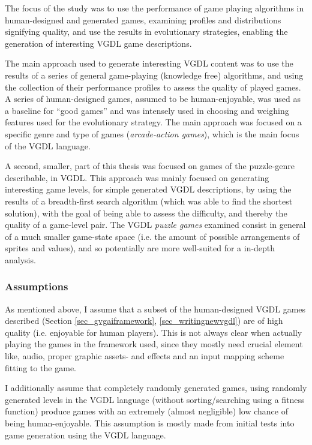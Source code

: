 \documentclass[a4paper,titlepage,final]{report}
\begin{document}
The focus of the study was to use the performance of game playing algorithms in human-designed and generated games, examining profiles and distributions signifying quality, and use the results in evolutionary strategies, enabling the generation of interesting VGDL game descriptions.

The main approach used to generate interesting VGDL content was to use the results of a series of general game-playing (knowledge free) algorithms, and using the collection of their performance profiles to assess the quality of played games.
A series of human-designed games, assumed to be human-enjoyable, was used as a baseline for ``good games'' and was intensely used in choosing and weighing features used for the evolutionary strategy.
The main approach was focused on a specific genre and type of games (\textit{arcade-action games}), which is the main focus of the VGDL language. 

A second, smaller, part of this thesis was focused on games of the puzzle-genre describable, in VGDL.
This approach was mainly focused on generating interesting game levels, for simple generated VGDL descriptions, by using the results of a breadth-first search algorithm (which was able to find the shortest solution), with the goal of being able to assess the difficulty, and thereby the quality of a game-level pair.
The VGDL \textit{puzzle games} examined consist in general of a much smaller game-state space (i.e. the amount of possible arrangements of sprites and values), and so potentially are more well-suited for a in-depth analysis.


\subsubsection*{Assumptions}
As mentioned above, I assume that a subset of the human-designed VGDL games described (Section \ref{sec_gvgaiframework}, \ref{sec_writingnewvgdl}) are of high quality (i.e. enjoyable for human players). 
This is not always clear when actually playing the games in the framework used, since they mostly need crucial element like, audio, proper graphic assets- and effects and an input mapping scheme fitting to the game.

I additionally assume that completely randomly generated games, using randomly generated levels in the VGDL language (without sorting/searching using a fitness function) produce games with an extremely (almost negligible) low chance of being human-enjoyable.
This assumption is mostly made from initial tests into game generation using the VGDL language.
\end{document}
